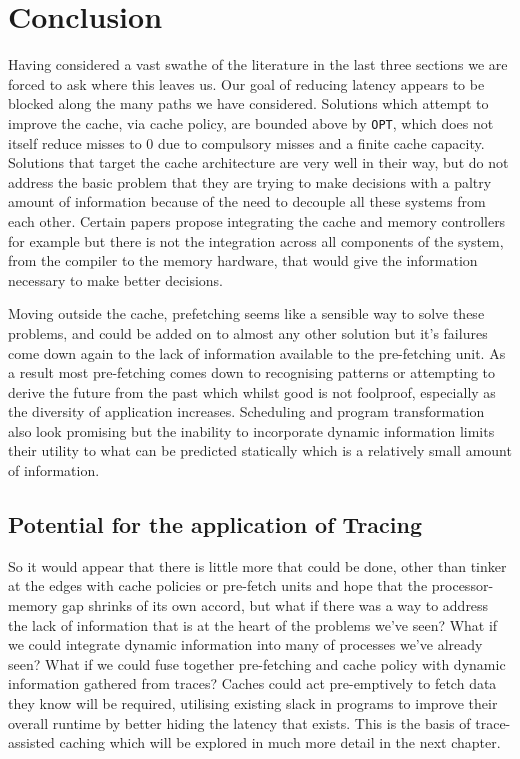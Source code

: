 \section{Conclusion}

Having considered a vast swathe of the literature in the last three sections we are forced to ask where this leaves us. Our goal of reducing latency appears to be blocked along the many paths we have considered. Solutions which attempt to improve the cache, via cache policy, are bounded above by \texttt{OPT}, which does not itself reduce misses to 0 due to compulsory misses and a finite cache capacity. Solutions that target the cache architecture are very well in their way, but do not address the basic problem that they are trying to make decisions with a paltry amount of information because of the need to decouple all these systems from each other. Certain papers propose integrating the cache and memory controllers for example \cite{stuecheliCoordinatingDRAMLastLevelCache2011} but there is not the integration across all components of the system, from the compiler to the memory hardware, that would give the information necessary to make better decisions.

Moving outside the cache, prefetching seems like a sensible way to solve these problems, and could be added on to almost any other solution but it's failures come down again to the lack of information available to the pre-fetching unit. As a result most pre-fetching comes down to recognising patterns or attempting to derive the future from the past which whilst good is not foolproof, especially as the diversity of application increases. Scheduling and program transformation also look promising but the inability to incorporate dynamic information limits their utility to what can be predicted statically which is a relatively small amount of information. 

\subsection{Potential for the application of Tracing}

So it would appear that there is little more that could be done, other than tinker at the edges with cache policies or pre-fetch units and hope that the processor-memory gap shrinks of its own accord, but what if there was a way to address the lack of information that is at the heart of the problems we've seen? What if we could integrate dynamic information into many of processes we've already seen? What if we could fuse together pre-fetching and cache policy with dynamic information gathered from traces? Caches could act pre-emptively to fetch data they know will be required, utilising existing slack in programs to improve their overall runtime by better hiding the latency that exists. This is the basis of trace-assisted caching which will be explored in much more detail in the next chapter. 

